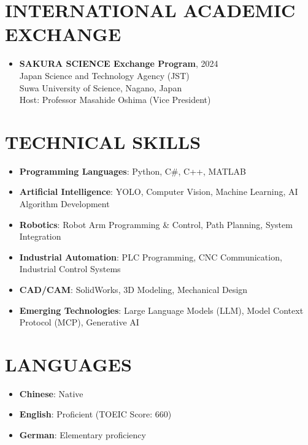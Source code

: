 \documentclass[11pt,a4paper]{article}
\begin{document}
\section*{INTERNATIONAL ACADEMIC EXCHANGE}

\begin{itemize}[leftmargin=*, itemsep=4pt]
    \item \textbf{SAKURA SCIENCE Exchange Program}, 2024\\
    Japan Science and Technology Agency (JST)\\
    Suwa University of Science, Nagano, Japan\\
    Host: Professor Masahide Oshima (Vice President)
\end{itemize}

\section*{TECHNICAL SKILLS}

\begin{itemize}[leftmargin=*, itemsep=2pt]
    \item \textbf{Programming Languages}: Python, C\#, C++, MATLAB
    \item \textbf{Artificial Intelligence}: YOLO, Computer Vision, Machine Learning, AI Algorithm Development
    \item \textbf{Robotics}: Robot Arm Programming \& Control, Path Planning, System Integration
    \item \textbf{Industrial Automation}: PLC Programming, CNC Communication, Industrial Control Systems
    \item \textbf{CAD/CAM}: SolidWorks, 3D Modeling, Mechanical Design
    \item \textbf{Emerging Technologies}: Large Language Models (LLM), Model Context Protocol (MCP), Generative AI
\end{itemize}

\section*{LANGUAGES}

\begin{itemize}[leftmargin=*, itemsep=2pt]
    \item \textbf{Chinese}: Native
    \item \textbf{English}: Proficient (TOEIC Score: 660)
    \item \textbf{German}: Elementary proficiency
\end{itemize}
\end{document}
